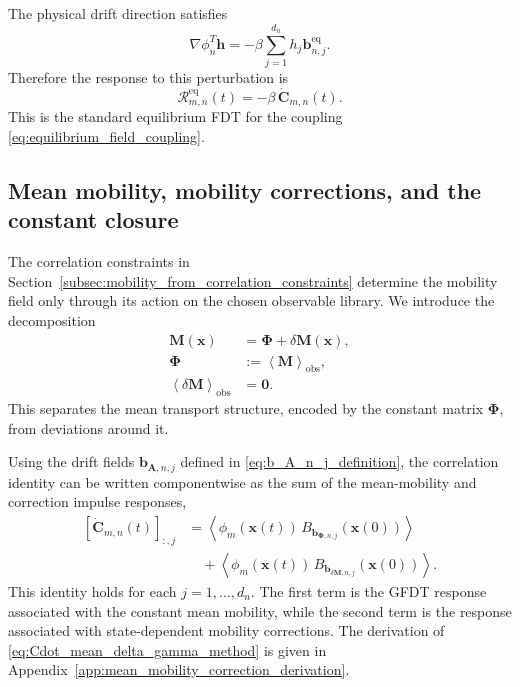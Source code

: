 \documentclass[11pt,twoside,fleqn]{article}
\begin{document}
The physical drift direction satisfies
\begin{equation}
    \nabla\phi_n^T\bm{h}
    =
    -\beta
    \sum_{j=1}^{d_n}
        h_j\bm{b}^{\mathrm{eq}}_{n,j}.
    \label{eq:equilibrium_physical_drift_b_decomposition}
\end{equation}
Therefore the response to this perturbation is
\begin{equation}
    \bm{\mathcal{R}}^{\mathrm{eq}}_{m,n}(t)
    =
    -\beta\,\dot{\bm{C}}_{m,n}(t).
    \label{eq:equilibrium_fdt_recovered}
\end{equation}
This is the standard equilibrium FDT for the coupling
\eqref{eq:equilibrium_field_coupling}.

\subsection{Mean mobility, mobility corrections, and the constant closure}
\label{subsec:mean_mobility_and_corrections}

The correlation constraints in Section~\ref{subsec:mobility_from_correlation_constraints} determine the mobility field only through its action on the chosen observable library. We introduce the decomposition
\begin{equation}
\begin{aligned}
    \bm{M}(\bm{x})
    &=
    \bm{\Phi}
    +
    \delta\bm{M}(\bm{x}),
    \\
    \bm{\Phi}
    &:=
    \left\langle
        \bm{M}
    \right\rangle_{\mathrm{obs}},
    \\
    \left\langle
        \delta\bm{M}
    \right\rangle_{\mathrm{obs}}
    &=
    \bm{0}.
\end{aligned}
    \label{eq:mobility_mean_fluctuation_decomposition}
\end{equation}
This separates the mean transport structure, encoded by the constant matrix $\bm{\Phi}$, from deviations around it.

Using the drift fields \(\bm{b}_{\bm{A},n,j}\) defined in
\eqref{eq:b_A_n_j_definition}, the correlation identity can be written
componentwise as the sum of the mean-mobility and correction impulse responses,
\begin{equation}
\begin{aligned}
    \left[\dot{\bm{C}}_{m,n}(t)\right]_{:,j}
    &=
    \left\langle
        \phi_m(\bm{x}(t))\,
        B_{\bm{b}_{\bm{\Phi},n,j}}(\bm{x}(0))
    \right\rangle
    \\
    &\quad+
    \left\langle
        \phi_m(\bm{x}(t))\,
        B_{\bm{b}_{\delta\bm{M},n,j}}(\bm{x}(0))
    \right\rangle .
\end{aligned}
    \label{eq:Cdot_mean_delta_gamma_method}
\end{equation}
This identity holds for each \(j=1,\dots,d_n\).
The first term is the GFDT response associated with the constant mean mobility,
while the second term is the response associated with state-dependent mobility
corrections. The derivation of \eqref{eq:Cdot_mean_delta_gamma_method} is given
in Appendix~\ref{app:mean_mobility_correction_derivation}.
\end{document}
